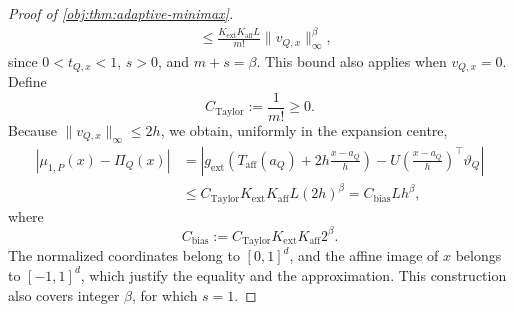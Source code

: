 \documentclass[11pt]{article}
\begin{document}
\begin{proof}[Proof of \cref{obj:thm:adaptive-minimax}]
\[\begin{aligned}
&\le
\frac{K_{\mathrm{ext}}K_{\mathrm{aff}}L}{m!}
\|v_{Q,x}\|_\infty^\beta,
\end{aligned}
\]
since \(0<t_{Q,x}<1\), \(s>0\), and \(m+s=\beta\). This bound also applies when \(v_{Q,x}=0\). Define
\[
C_{\mathrm{Taylor}}:=\frac1{m!}\ge0.
\]
Because \(\|v_{Q,x}\|_\infty\le2h\), we obtain, uniformly in the expansion centre,
\[
\begin{aligned}
|\mu_{1,P}(x)-\Pi_Q(x)|
&=
\left|
g_{\mathrm{ext}}\!\left(
T_{\mathrm{aff}}(a_Q)+2h\frac{x-a_Q}{h}
\right)
-
U\!\left(\frac{x-a_Q}{h}\right)^\top\vartheta_Q
\right|
\\
&\le
C_{\mathrm{Taylor}}K_{\mathrm{ext}}K_{\mathrm{aff}}L(2h)^\beta
=
C_{\mathrm{bias}}Lh^\beta,
\end{aligned}
\]
where
\[
C_{\mathrm{bias}}
:=
C_{\mathrm{Taylor}}K_{\mathrm{ext}}K_{\mathrm{aff}}2^\beta.
\]
The normalized coordinates belong to \([0,1]^d\), and the affine image of \(x\) belongs to \([-1,1]^d\), which justify the equality and the approximation. This construction also covers integer \(\beta\), for which \(s=1\).


\end{proof}
\end{document}
